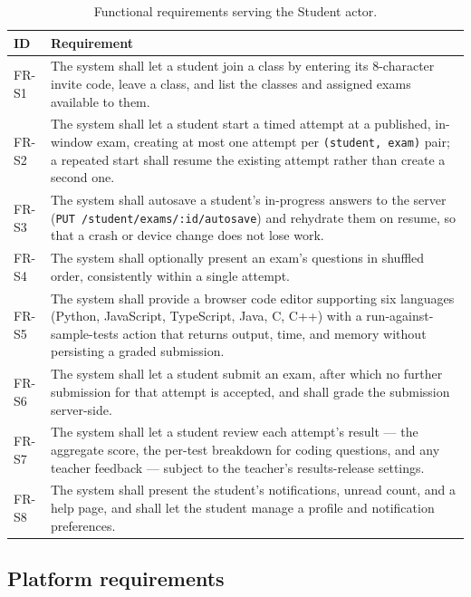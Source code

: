 \begin{table}[htbp]
\centering
\caption{Functional requirements serving the Student actor.}
\label{tab:fr-student}
\small
\begin{tabularx}{\textwidth}{@{}L{1.6cm} X@{}}
\toprule
\textbf{ID} & \textbf{Requirement} \\
\midrule
FR-S1 & The system shall let a student join a class by entering its 8-character invite
code, leave a class, and list the classes and assigned exams available to them. \\
FR-S2 & The system shall let a student start a timed attempt at a published, in-window
exam, creating at most one attempt per \texttt{(student, exam)} pair; a repeated start
shall resume the existing attempt rather than create a second one. \\
FR-S3 & The system shall autosave a student's in-progress answers to the server (\texttt{PUT
/student/exams/:id/autosave}) and rehydrate them on resume, so that a crash or device
change does not lose work. \\
FR-S4 & The system shall optionally present an exam's questions in shuffled order,
consistently within a single attempt. \\
FR-S5 & The system shall provide a browser code editor supporting six languages (Python,
JavaScript, TypeScript, Java, C, C++) with a run-against-sample-tests action that returns
output, time, and memory without persisting a graded submission. \\
FR-S6 & The system shall let a student submit an exam, after which no further submission
for that attempt is accepted, and shall grade the submission server-side. \\
FR-S7 & The system shall let a student review each attempt's result --- the aggregate
score, the per-test breakdown for coding questions, and any teacher feedback --- subject
to the teacher's results-release settings. \\
FR-S8 & The system shall present the student's notifications, unread count, and a help
page, and shall let the student manage a profile and notification preferences. \\
\bottomrule
\end{tabularx}
\end{table}

\subsection{Platform requirements}
\label{sec:req-fr-platform}

